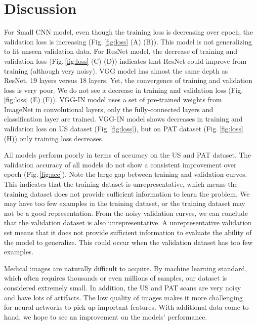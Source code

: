 \section{Discussion}
\label{result_discussion}

For Small CNN model, even though the training loss is decreasing over epoch, the validation loss is increasing (Fig.\,\ref{fig:loss} (A) (B)). This model is not generalizing to fit unseen validation data. For ResNet model, the decrease of training and validation loss (Fig.\,\ref{fig:loss} (C) (D)) indicates that ResNet could improve from training (although very noisy). VGG model has almost the same depth as ResNet, 19 layers versus 18 layers. Yet, the convergence of training and validation loss is very poor. We do not see a decrease in training and validation loss (Fig.\,\ref{fig:loss} (E) (F)). VGG-IN model uses a set of pre-trained weights from ImageNet \citep{imagenet_cvpr09} in convolutional layers, only the fully-connected layers and classification layer are trained. VGG-IN model shows decreases in training and validation loss on US dataset (Fig.\,\ref{fig:loss}), but on PAT dataset (Fig.\,\ref{fig:loss} (H)) only training loss decreases.

All models perform poorly in terms of accuracy on the US and PAT dataset. The validation accuracy of all models do not show a consistent improvement over epoch (Fig.\,\ref{fig:acc}). Note the large gap between training and validation curves. This indicates that the training dataset is unrepresentative, which means the training dataset does not provide sufficient information to learn the problem. We may have too few examples in the training dataset, or the training dataset may not be a good representation. From the noisy validation curves, we can conclude that the validation dataset is also unrepresentative. A unrepresentative validation set means that it does not provide sufficient information to evaluate the ability of the model to generalize. This could occur when the validation dataset has too few examples.

Medical images are naturally difficult to acquire. By machine learning standard, which often requires thousands or even millions of samples, our dataset is considered extremely small. In addition, the US and PAT scans are very noisy and have lots of artifacts. The low quality of images makes it more challenging for neural networks to pick up important features. With additional data come to hand, we hope to see an improvement on the models' performance.

